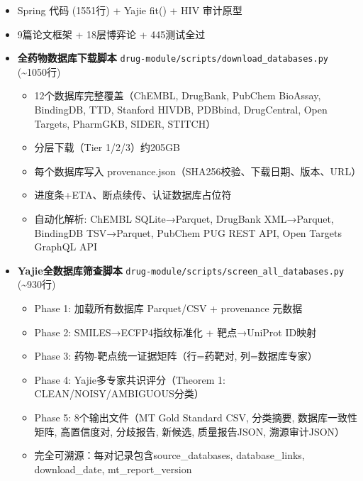 \documentclass[
  12pt,
]{ctexart}
\providecommand{\tightlist}{%
  \setlength{\itemsep}{0pt}\setlength{\parskip}{0pt}}
\begin{document}
\begin{itemize}
\tightlist
\item[$\boxtimes$]
  Spring 代码 (1551行) + Yajie fit() + HIV 审计原型
\item[$\boxtimes$]
  9篇论文框架 + 18层博弈论 + 445测试全过
\item[$\boxtimes$]
  \textbf{全药物数据库下载脚本}
  \texttt{drug-module/scripts/download\_databases.py}
  (\textasciitilde1050行)

  \begin{itemize}
  \tightlist
  \item
    12个数据库完整覆盖（ChEMBL, DrugBank, PubChem BioAssay, BindingDB,
    TTD, Stanford HIVDB, PDBbind, DrugCentral, Open Targets, PharmGKB,
    SIDER, STITCH）
  \item
    分层下载（Tier 1/2/3）约205GB
  \item
    每个数据库写入 provenance.json（SHA256校验、下载日期、版本、URL）
  \item
    进度条+ETA、断点续传、认证数据库占位符
  \item
    自动化解析: ChEMBL SQLite→Parquet, DrugBank XML→Parquet, BindingDB
    TSV→Parquet, PubChem PUG REST API, Open Targets GraphQL API
  \end{itemize}
\item[$\boxtimes$]
  \textbf{Yajie全数据库筛查脚本}
  \texttt{drug-module/scripts/screen\_all\_databases.py}
  (\textasciitilde930行)

  \begin{itemize}
  \tightlist
  \item
    Phase 1: 加载所有数据库 Parquet/CSV + provenance 元数据
  \item
    Phase 2: SMILES→ECFP4指纹标准化 + 靶点→UniProt ID映射
  \item
    Phase 3: 药物-靶点统一证据矩阵（行=药靶对, 列=数据库专家）
  \item
    Phase 4: Yajie多专家共识评分（Theorem 1: CLEAN/NOISY/AMBIGUOUS分类）
  \item
    Phase 5: 8个输出文件（MT Gold Standard CSV, 分类摘要,
    数据库一致性矩阵, 高置信度对, 分歧报告, 新候选, 质量报告JSON,
    溯源审计JSON）
  \item
    完全可溯源：每对记录包含source\_databases, database\_links,
    download\_date, mt\_report\_version
  \end{itemize}
\end{itemize}
\end{document}

